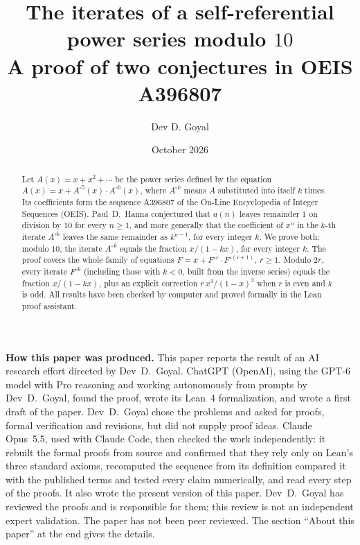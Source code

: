 \documentclass[11pt,a4paper]{article}
\title{The iterates of a self-referential power series modulo $10$\\[6pt]\large A proof of two conjectures in OEIS A396807}
\author{Dev D. Goyal}
\date{October 2026}
\theoremstyle{definition}
\theoremstyle{remark}
\begin{document}
\maketitle
\begin{abstract}
Let $A(x)=x+x^2+\cdots$ be the power series defined by the equation
$A(x)=x+A^{\circ5}(x)\cdot A^{\circ6}(x)$, where $A^{\circ k}$ means $A$ substituted into
itself $k$ times. Its coefficients form the sequence A396807 of the On-Line Encyclopedia of Integer Sequences
(OEIS). Paul~D.~Hanna conjectured that $a(n)$ leaves remainder $1$ on division by $10$ for every $n\ge1$, and more generally
that the coefficient of $x^n$ in the $k$-th iterate $A^{\circ k}$ leaves the same remainder as $k^{n-1}$, for every
integer $k$. We prove both: modulo $10$, the iterate $A^{\circ k}$ equals the fraction $x/(1-kx)$, for every integer
$k$. The proof covers the whole family of
equations $F=x+F^{\circ r}\cdot F^{\circ(r+1)}$, $r\ge1$. Modulo $2r$, every iterate $F^{\circ k}$ (including those
with $k<0$, built from the inverse series) equals the fraction $x/(1-kx)$, plus an explicit correction
$r\,x^4/(1-x)^3$ when $r$ is even and $k$ is odd. All results have been checked by computer and proved formally in the
Lean proof assistant.
\end{abstract}
\begin{center}\begin{minipage}{0.88\linewidth}\small
\textbf{How this paper was produced.} This paper reports the result of an AI research effort directed by
Dev~D.~Goyal. ChatGPT (OpenAI), using the GPT-6 model with Pro reasoning and working autonomously from prompts by
Dev~D.~Goyal, found the proof, wrote its Lean~4 formalization, and wrote a first draft of the paper.
Dev~D.~Goyal chose the problems and asked for proofs, formal verification and revisions, but did not supply proof
ideas. Claude Opus~5.5, used with Claude Code, then checked the work independently: it rebuilt the formal proofs from
source and confirmed that they rely only on Lean's three standard axioms, recomputed the sequence from its definition
compared it with the published terms and tested every claim numerically, and read every step of the proofs. It also wrote the present
version of this paper.
Dev~D.~Goyal has reviewed the proofs and is responsible for them; this review is not an independent expert validation.
The paper has not been peer reviewed.
The section ``About this paper'' at the end gives the details.
\end{minipage}\end{center}
\end{document}
